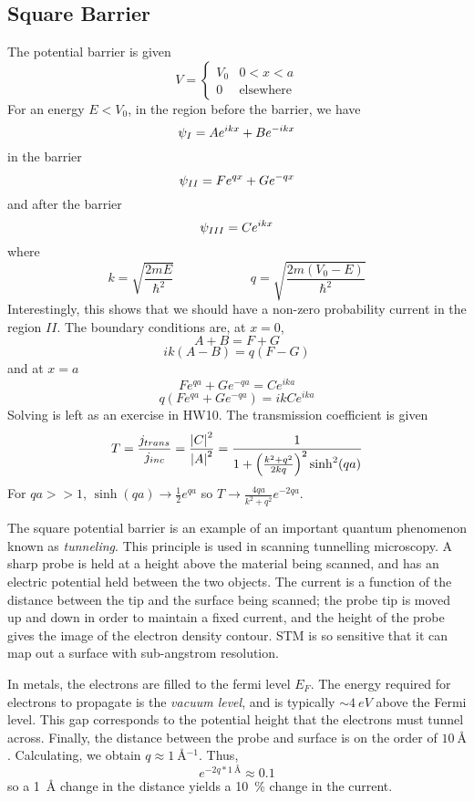 \subsection{Square Barrier}
The potential barrier is given
\[V = \begin{cases}
	V_0 & 0<x<a\\
	0 & \text{elsewhere}
\end{cases}\]
For an energy \(E<V_0\), in the region before the barrier, we have
\[\psi_I = Ae^{ikx}+Be^{-ikx}\]
in the barrier
\[\psi_{II}=Fe^{qx}+Ge^{-qx}\]
and after the barrier
\[\psi_{III}=Ce^{ikx}\]
where
\[k = \sqrt{\frac{2mE}{\hbar^2}} \qquad \qquad \qquad q = \sqrt{\frac{2m(V_0-E)}{\hbar^2}}\]
Interestingly, this shows that we should have a non-zero probability current in the region \(II\).
The boundary conditions are, at \(x=0\),
\[A+B=F+G\]
\[ik(A-B)=q(F-G)\]
and at \(x=a\)
\[Fe^{qa}+Ge^{-qa}=Ce^{ika}\]
\[q\left(Fe^{qa}+Ge^{-qa}\right)=ikCe^{ika}\]
Solving is left as an exercise in HW10. The transmission coefficient is given
\begin{equation}
	T = \frac{j_{trans}}{j_{inc}} = \frac{\left|C\right|^2}{\left|A\right|^2}=\frac{1}{1+\left(\frac{k^2+q^2}{2kq}\right)^2\sinh^2(qa)}
\end{equation}
For \(qa>>1\), \(\sinh(qa)\to \frac{1}{2}e^{qa}\) so \(T\to \frac{4qa}{k^2+q^2}e^{-2qa}\).

The square potential barrier is an example of an important quantum phenomenon known as \emph{tunneling}. This principle is used in scanning tunnelling microscopy. A sharp probe is held at a height above the material being scanned, and has an electric potential held between the two objects. The current is a function of the distance between the tip and the surface being scanned; the probe tip is moved up and down in order to maintain a fixed current, and the height of the probe gives the image of the electron density contour. STM is so sensitive that it can map out a surface with sub-angstrom resolution.

\begin{aside}
In metals, the electrons are filled to the fermi level \(E_F\). The energy required for electrons to propagate is the \emph{vacuum level}, and is typically \(\sim \SI{4}{eV}\) above the Fermi level. This gap corresponds to the potential height that the electrons must tunnel across. Finally, the distance between the probe and surface is on the order of \(\SI{10}{\angstrom}\). Calculating, we obtain \(q\approx \SI{1}{\angstrom^{-1}}\). Thus,
\[e^{-2q*\SI{1}{\angstrom}}\approx 0.1\]
so a \SI{1}{\angstrom} change in the distance yields a \SI{10}{\percent} change in the current.
\end{aside}

